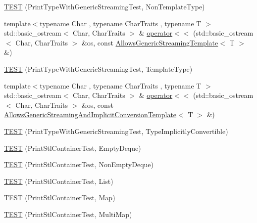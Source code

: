 \begin{DoxyCompactItemize}
\item 
\hyperlink{namespacetesting_1_1gtest__printers__test_a9272037c799c4779e1d79476dad66cb6}{T\+E\+ST} (Print\+Type\+With\+Generic\+Streaming\+Test, Non\+Template\+Type)
\item 
{\footnotesize template$<$typename Char , typename Char\+Traits , typename T $>$ }\\std\+::basic\+\_\+ostream$<$ Char, Char\+Traits $>$ \& \hyperlink{namespacetesting_1_1gtest__printers__test_a5464168e925b1adf29986c8e544e908e}{operator$<$$<$} (std\+::basic\+\_\+ostream$<$ Char, Char\+Traits $>$ \&os, const \hyperlink{classtesting_1_1gtest__printers__test_1_1_allows_generic_streaming_template}{Allows\+Generic\+Streaming\+Template}$<$ T $>$ \&)
\item 
\hyperlink{namespacetesting_1_1gtest__printers__test_a6e180c85f307712a995985f7bc735fd1}{T\+E\+ST} (Print\+Type\+With\+Generic\+Streaming\+Test, Template\+Type)
\item 
{\footnotesize template$<$typename Char , typename Char\+Traits , typename T $>$ }\\std\+::basic\+\_\+ostream$<$ Char, Char\+Traits $>$ \& \hyperlink{namespacetesting_1_1gtest__printers__test_a09eedfbca613302efe6438d2a537f419}{operator$<$$<$} (std\+::basic\+\_\+ostream$<$ Char, Char\+Traits $>$ \&os, const \hyperlink{classtesting_1_1gtest__printers__test_1_1_allows_generic_streaming_and_implicit_conversion_template}{Allows\+Generic\+Streaming\+And\+Implicit\+Conversion\+Template}$<$ T $>$ \&)
\item 
\hyperlink{namespacetesting_1_1gtest__printers__test_a68877c5e1ec7a53281798310c30e1776}{T\+E\+ST} (Print\+Type\+With\+Generic\+Streaming\+Test, Type\+Implicitly\+Convertible)
\item 
\hyperlink{namespacetesting_1_1gtest__printers__test_a1ce10b8a3634e0f6bfbfbb5888c04a95}{T\+E\+ST} (Print\+Stl\+Container\+Test, Empty\+Deque)
\item 
\hyperlink{namespacetesting_1_1gtest__printers__test_a249d482cf4a1525bd043489dcbd3e200}{T\+E\+ST} (Print\+Stl\+Container\+Test, Non\+Empty\+Deque)
\item 
\hyperlink{namespacetesting_1_1gtest__printers__test_aaa135672ff79ecaef82c6046f2ab8d29}{T\+E\+ST} (Print\+Stl\+Container\+Test, List)
\item 
\hyperlink{namespacetesting_1_1gtest__printers__test_a3d701a1866f260a42411e9041894c49c}{T\+E\+ST} (Print\+Stl\+Container\+Test, Map)
\item 
\hyperlink{namespacetesting_1_1gtest__printers__test_a8a498c956a5b1c0358d126e1ad56fac0}{T\+E\+ST} (Print\+Stl\+Container\+Test, Multi\+Map)

\end{DoxyCompactItemize}
